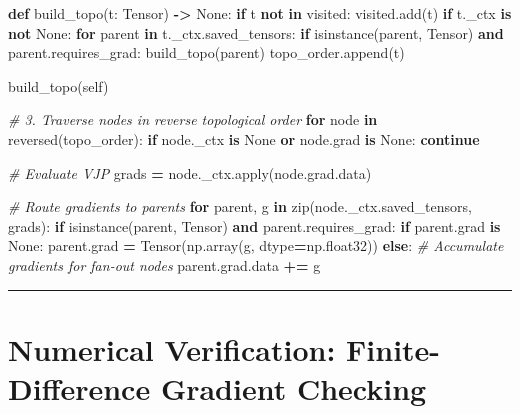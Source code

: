 \documentclass[
  letterpaper,
]{scrbook}
\newenvironment{Shaded}{\begin{snugshade}}{\end{snugshade}}
\newcommand{\BuiltInTok}[1]{#1}
\newcommand{\CommentTok}[1]{\textcolor[rgb]{0.56,0.35,0.01}{\textit{#1}}}
\newcommand{\ControlFlowTok}[1]{\textcolor[rgb]{0.13,0.29,0.53}{\textbf{#1}}}
\newcommand{\KeywordTok}[1]{\textcolor[rgb]{0.13,0.29,0.53}{\textbf{#1}}}
\newcommand{\NormalTok}[1]{#1}
\newcommand{\OperatorTok}[1]{\textcolor[rgb]{0.81,0.36,0.00}{\textbf{#1}}}
\newcommand{\VariableTok}[1]{\textcolor[rgb]{0.00,0.00,0.00}{#1}}
\begin{document}
\begin{Shaded}
\begin{Highlighting}[]
    \KeywordTok{def}\NormalTok{ build\_topo(t: Tensor) }\OperatorTok{{-}\textgreater{}} \VariableTok{None}\NormalTok{:}
        \ControlFlowTok{if}\NormalTok{ t }\KeywordTok{not} \KeywordTok{in}\NormalTok{ visited:}
\NormalTok{            visited.add(t)}
            \ControlFlowTok{if}\NormalTok{ t.\_ctx }\KeywordTok{is} \KeywordTok{not} \VariableTok{None}\NormalTok{:}
                \ControlFlowTok{for}\NormalTok{ parent }\KeywordTok{in}\NormalTok{ t.\_ctx.saved\_tensors:}
                    \ControlFlowTok{if} \BuiltInTok{isinstance}\NormalTok{(parent, Tensor) }\KeywordTok{and}\NormalTok{ parent.requires\_grad:}
\NormalTok{                        build\_topo(parent)}
\NormalTok{            topo\_order.append(t)}

\NormalTok{    build\_topo(}\VariableTok{self}\NormalTok{)}

    \CommentTok{\# 3. Traverse nodes in reverse topological order}
    \ControlFlowTok{for}\NormalTok{ node }\KeywordTok{in} \BuiltInTok{reversed}\NormalTok{(topo\_order):}
        \ControlFlowTok{if}\NormalTok{ node.\_ctx }\KeywordTok{is} \VariableTok{None} \KeywordTok{or}\NormalTok{ node.grad }\KeywordTok{is} \VariableTok{None}\NormalTok{:}
            \ControlFlowTok{continue}

        \CommentTok{\# Evaluate VJP}
\NormalTok{        grads }\OperatorTok{=}\NormalTok{ node.\_ctx.}\BuiltInTok{apply}\NormalTok{(node.grad.data)}

        \CommentTok{\# Route gradients to parents}
        \ControlFlowTok{for}\NormalTok{ parent, g }\KeywordTok{in} \BuiltInTok{zip}\NormalTok{(node.\_ctx.saved\_tensors, grads):}
            \ControlFlowTok{if} \BuiltInTok{isinstance}\NormalTok{(parent, Tensor) }\KeywordTok{and}\NormalTok{ parent.requires\_grad:}
                \ControlFlowTok{if}\NormalTok{ parent.grad }\KeywordTok{is} \VariableTok{None}\NormalTok{:}
\NormalTok{                    parent.grad }\OperatorTok{=}\NormalTok{ Tensor(np.array(g, dtype}\OperatorTok{=}\NormalTok{np.float32))}
                \ControlFlowTok{else}\NormalTok{:}
                    \CommentTok{\# Accumulate gradients for fan{-}out nodes}
\NormalTok{                    parent.grad.data }\OperatorTok{+=}\NormalTok{ g}
\end{Highlighting}
\end{Shaded}

\begin{center}\rule{0.5\linewidth}{0.5pt}\end{center}

\section{Numerical Verification: Finite-Difference Gradient
Checking}\label{numerical-verification-finite-difference-gradient-checking}
\end{document}
